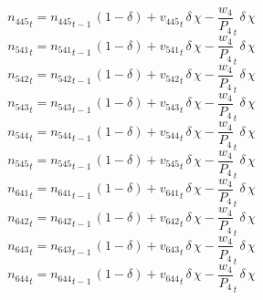 \begin{dmath}
{{n_{445}}}_{t}={{n_{445}}}_{t-1}\, \left(1-{{\delta}}\right)+{{v_{445}}}_{t}\, {{\delta}}\, {{\chi}}-{{\frac{w_{4}}{P_{4}}}}_{t}\, {{\delta}}\, {{\chi}}
\end{dmath}
\begin{dmath}
{{n_{541}}}_{t}={{n_{541}}}_{t-1}\, \left(1-{{\delta}}\right)+{{v_{541}}}_{t}\, {{\delta}}\, {{\chi}}-{{\frac{w_{4}}{P_{4}}}}_{t}\, {{\delta}}\, {{\chi}}
\end{dmath}
\begin{dmath}
{{n_{542}}}_{t}={{n_{542}}}_{t-1}\, \left(1-{{\delta}}\right)+{{v_{542}}}_{t}\, {{\delta}}\, {{\chi}}-{{\frac{w_{4}}{P_{4}}}}_{t}\, {{\delta}}\, {{\chi}}
\end{dmath}
\begin{dmath}
{{n_{543}}}_{t}={{n_{543}}}_{t-1}\, \left(1-{{\delta}}\right)+{{v_{543}}}_{t}\, {{\delta}}\, {{\chi}}-{{\frac{w_{4}}{P_{4}}}}_{t}\, {{\delta}}\, {{\chi}}
\end{dmath}
\begin{dmath}
{{n_{544}}}_{t}={{n_{544}}}_{t-1}\, \left(1-{{\delta}}\right)+{{v_{544}}}_{t}\, {{\delta}}\, {{\chi}}-{{\frac{w_{4}}{P_{4}}}}_{t}\, {{\delta}}\, {{\chi}}
\end{dmath}
\begin{dmath}
{{n_{545}}}_{t}={{n_{545}}}_{t-1}\, \left(1-{{\delta}}\right)+{{v_{545}}}_{t}\, {{\delta}}\, {{\chi}}-{{\frac{w_{4}}{P_{4}}}}_{t}\, {{\delta}}\, {{\chi}}
\end{dmath}
\begin{dmath}
{{n_{641}}}_{t}={{n_{641}}}_{t-1}\, \left(1-{{\delta}}\right)+{{v_{641}}}_{t}\, {{\delta}}\, {{\chi}}-{{\frac{w_{4}}{P_{4}}}}_{t}\, {{\delta}}\, {{\chi}}
\end{dmath}
\begin{dmath}
{{n_{642}}}_{t}={{n_{642}}}_{t-1}\, \left(1-{{\delta}}\right)+{{v_{642}}}_{t}\, {{\delta}}\, {{\chi}}-{{\frac{w_{4}}{P_{4}}}}_{t}\, {{\delta}}\, {{\chi}}
\end{dmath}
\begin{dmath}
{{n_{643}}}_{t}={{n_{643}}}_{t-1}\, \left(1-{{\delta}}\right)+{{v_{643}}}_{t}\, {{\delta}}\, {{\chi}}-{{\frac{w_{4}}{P_{4}}}}_{t}\, {{\delta}}\, {{\chi}}
\end{dmath}
\begin{dmath}
{{n_{644}}}_{t}={{n_{644}}}_{t-1}\, \left(1-{{\delta}}\right)+{{v_{644}}}_{t}\, {{\delta}}\, {{\chi}}-{{\frac{w_{4}}{P_{4}}}}_{t}\, {{\delta}}\, {{\chi}}
\end{dmath}
